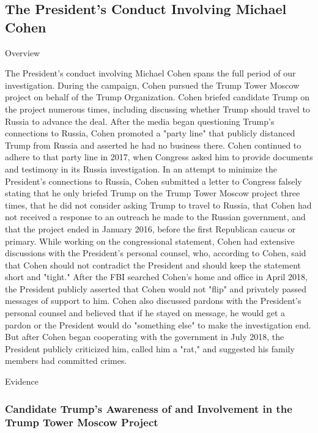 
\subsection{The President's Conduct Involving Michael Cohen}

Overview

The President's conduct involving Michael Cohen spans the full period of our investigation.
During the campaign, Cohen pursued the Trump Tower Moscow project on behalf of the Trump Organization.
Cohen briefed candidate Trump on the project numerous times, including discussing whether Trump should travel to Russia to advance the deal.
After the media began questioning Trump's connections to Russia, Cohen promoted a "party line" that publicly distanced Trump from Russia and asserted he had no business there.
Cohen continued to adhere to that party line in 2017, when Congress asked him to provide documents and testimony in its Russia investigation.
In an attempt to minimize the President's connections to Russia, Cohen submitted a letter to Congress falsely stating that he only briefed Trump on the Trump Tower Moscow project three times, that he did not consider asking Trump to travel to Russia, that Cohen had not received a response to an outreach he made to the Russian government, and that the project ended in January 2016, before the first Republican caucus or primary.
While working on the congressional statement, Cohen had extensive discussions with the President's personal counsel, who, according to Cohen, said that Cohen should not contradict the President and should keep the statement short and "tight."
After the FBI searched Cohen's home and office in April 2018, the President publicly asserted that Cohen would not "flip" and privately passed messages of support to him.
Cohen also discussed pardons with the President's personal counsel and believed that if he stayed on message, he would get a pardon or the President would do "something else" to make the investigation end.
But after Cohen began cooperating with the government in July 2018, the President publicly criticized him, called him a "rat," and suggested his family members had committed crimes.

Evidence

\subsubsection{Candidate Trump's Awareness of and Involvement in the Trump Tower Moscow Project}

